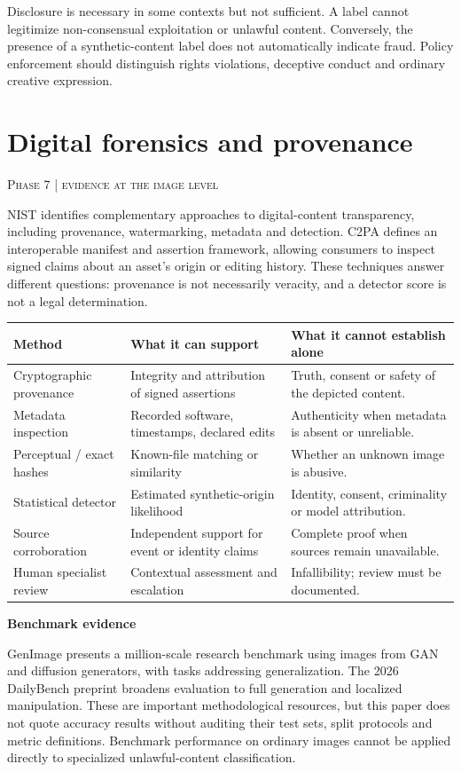 \documentclass[10pt,a4paper]{article}
\newcommand{\sect}[2]{\Needspace{6\baselineskip}\section{#1}\textcolor{muted}{\small\textsc{#2}}\par\vspace{2mm}}
\newcommand{\sub}[1]{\vspace{1mm}\textbf{#1}\par}
\begin{document}
Disclosure is necessary in some contexts but not sufficient. A label cannot legitimize non-consensual exploitation or unlawful content. Conversely, the presence of a synthetic-content label does not automatically indicate fraud. Policy enforcement should distinguish rights violations, deceptive conduct and ordinary creative expression.


\sect{Digital forensics and provenance}{Phase 7 | evidence at the image level}

NIST identifies complementary approaches to digital-content transparency, including provenance, watermarking, metadata and detection. C2PA defines an interoperable manifest and assertion framework, allowing consumers to inspect signed claims about an asset's origin or editing history. These techniques answer different questions: provenance is not necessarily veracity, and a detector score is not a legal determination. \cite{nist,c2pa}


\begin{center}\small\begin{tabularx}{\linewidth}{@{}YYY@{}}\toprule
\textbf{Method} & \textbf{What it can support} & \textbf{What it cannot establish alone}\\\midrule
Cryptographic provenance & Integrity and attribution of signed assertions & Truth, consent or safety of the depicted content.\\
Metadata inspection & Recorded software, timestamps, declared edits & Authenticity when metadata is absent or unreliable.\\
Perceptual / exact hashes & Known-file matching or similarity & Whether an unknown image is abusive.\\
Statistical detector & Estimated synthetic-origin likelihood & Identity, consent, criminality or model attribution.\\
Source corroboration & Independent support for event or identity claims & Complete proof when sources remain unavailable.\\
Human specialist review & Contextual assessment and escalation & Infallibility; review must be documented.\\\bottomrule\end{tabularx}\end{center}

\sub{Benchmark evidence}

GenImage presents a million-scale research benchmark using images from GAN and diffusion generators, with tasks addressing generalization. The 2026 DailyBench preprint broadens evaluation to full generation and localized manipulation. These are important methodological resources, but this paper does not quote accuracy results without auditing their test sets, split protocols and metric definitions. Benchmark performance on ordinary images cannot be applied directly to specialized unlawful-content classification. \cite{genimage,dailybench}
\end{document}
